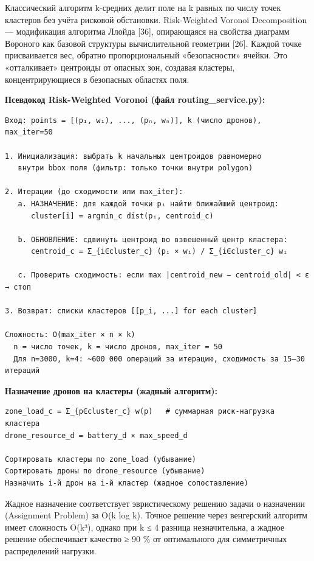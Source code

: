 Классический алгоритм k-средних делит поле на k равных по числу точек кластеров без учёта рисковой обстановки. Risk-Weighted Voronoi Decomposition --- модификация алгоритма Ллойда {[}36{]}, опирающаяся на свойства диаграмм Вороного как базовой структуры вычислительной геометрии {[}26{]}. Каждой точке присваивается вес, обратно пропорциональный «безопасности» ячейки. Это «отталкивает» центроиды от опасных зон, создавая кластеры, концентрирующиеся в безопасных областях поля.

\textbf{Псевдокод Risk-Weighted Voronoi (файл routing\_service.py):}

\begin{verbatim}
Вход: points = [(p₁, w₁), ..., (pₙ, wₙ)], k (число дронов), max_iter=50

1. Инициализация: выбрать k начальных центроидов равномерно
   внутри bbox поля (фильтр: только точки внутри polygon)

2. Итерации (до сходимости или max_iter):
   a. НАЗНАЧЕНИЕ: для каждой точки pᵢ найти ближайший центроид:
      cluster[i] = argmin_c dist(pᵢ, centroid_c)
   
   b. ОБНОВЛЕНИЕ: сдвинуть центроид во взвешенный центр кластера:
      centroid_c = Σ_{i∈cluster_c} (pᵢ × wᵢ) / Σ_{i∈cluster_c} wᵢ
   
   c. Проверить сходимость: если max |centroid_new − centroid_old| < ε → стоп

3. Возврат: списки кластеров [[p_i, ...] for each cluster]

Сложность: O(max_iter × n × k)
  n = число точек, k = число дронов, max_iter = 50
  Для n=3000, k=4: ~600 000 операций за итерацию, сходимость за 15–30 итераций
\end{verbatim}

\textbf{Назначение дронов на кластеры (жадный алгоритм):}

\begin{verbatim}
zone_load_c = Σ_{p∈cluster_c} w(p)   # суммарная риск-нагрузка кластера
drone_resource_d = battery_d × max_speed_d

Сортировать кластеры по zone_load (убывание)
Сортировать дроны по drone_resource (убывание)
Назначить i-й дрон на i-й кластер (жадное сопоставление)
\end{verbatim}

Жадное назначение соответствует эвристическому решению задачи о назначении (Assignment Problem) за O(k log k). Точное решение через венгерский алгоритм имеет сложность O(k³), однако при k ≤ 4 разница незначительна, а жадное решение обеспечивает качество ≥ 90 \% от оптимального для симметричных распределений нагрузки.

